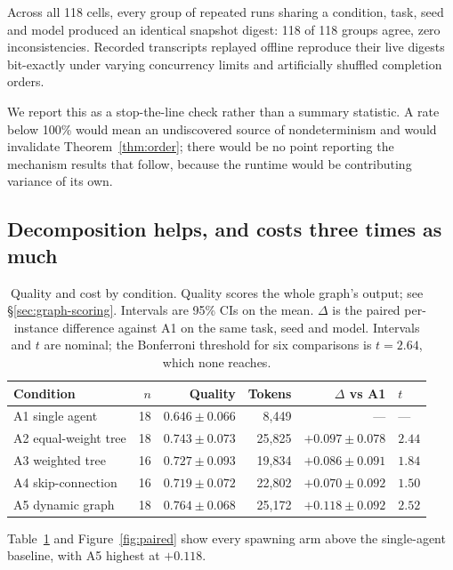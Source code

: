 \documentclass[10pt]{article}
\begin{document}
Across all 118 cells, every group of repeated runs sharing a condition, task,
seed and model produced an identical snapshot digest: 118 of 118 groups agree,
zero inconsistencies. Recorded transcripts replayed offline reproduce their live
digests bit-exactly under varying concurrency limits and artificially shuffled
completion orders.

We report this as a stop-the-line check rather than a summary statistic. A rate
below 100\% would mean an undiscovered source of nondeterminism and would
invalidate Theorem~\ref{thm:order}; there would be no point reporting the
mechanism results that follow, because the runtime would be contributing
variance of its own.

\subsection{Decomposition helps, and costs three times as much}

\begin{table}[t]
\centering
\caption{Quality and cost by condition. Quality scores the whole graph's
output; see \S\ref{sec:graph-scoring}. Intervals are 95\% CIs on the mean.
$\Delta$ is the paired per-instance difference against A1 on the same task,
seed and model. Intervals and $t$ are nominal; the Bonferroni threshold for six
comparisons is $t = 2.64$, which none reaches.}
\label{tab:main}
\begin{tabular}{lrrrrl}
\toprule
Condition & $n$ & Quality & Tokens & $\Delta$ vs A1 & $t$ \\
\midrule
A1 single agent      & 18 & $0.646 \pm 0.066$ & 8{,}449  & ---               & --- \\
A2 equal-weight tree & 18 & $0.743 \pm 0.073$ & 25{,}825 & $+0.097 \pm 0.078$ & $2.44$ \\
A3 weighted tree     & 16 & $0.727 \pm 0.093$ & 19{,}834 & $+0.086 \pm 0.091$ & $1.84$ \\
A4 skip-connection   & 16 & $0.719 \pm 0.072$ & 22{,}802 & $+0.070 \pm 0.092$ & $1.50$ \\
A5 dynamic graph     & 18 & $0.764 \pm 0.068$ & 25{,}172 & $+0.118 \pm 0.092$ & $2.52$ \\
\bottomrule
\end{tabular}
\end{table}

Table~\ref{tab:main} and Figure~\ref{fig:paired} show every spawning arm above
the single-agent baseline, with A5 highest at $+0.118$.
\end{document}
